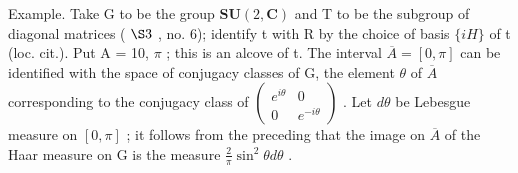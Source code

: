 Example. Take G to be the group \(\mathbf{SU}(2,\mathbf{C})\) and T to be the subgroup of diagonal matrices ( \(\S3\) , no. 6); identify t with R by the choice of basis \(\{iH\}\) of t (loc. cit.). Put A = 10, \(\pi\) ; this is an alcove of t. The interval \(\overline{A} = [0, \pi]\) can be identified with the space of conjugacy classes of G, the element \(\theta\) of \(\overline{A}\) corresponding to the conjugacy class of \(\begin{pmatrix} e^{i\theta} & 0 \\ 0 & e^{-i\theta} \end{pmatrix}\) . Let \(d\theta\) be Lebesgue measure on \([0, \pi]\) ; it follows from the preceding that the image on \(\overline{A}\) of the Haar measure on G is the measure \(\frac{2}{\pi}\sin^{2}\theta d\theta\) .

